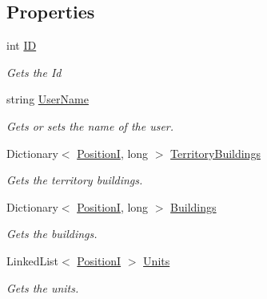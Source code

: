 \subsection*{Properties}
\begin{DoxyCompactItemize}
\item 
int \hyperlink{classCore_1_1Models_1_1Account_a7d03d99ad8aef36cd306111624ee9664}{I\+D}
\begin{DoxyCompactList}\small\item\em Gets the Id \end{DoxyCompactList}\item 
string \hyperlink{classCore_1_1Models_1_1Account_a1ffe9e8e0cfd0a45234e457a39c2de0f}{User\+Name}
\begin{DoxyCompactList}\small\item\em Gets or sets the name of the user. \end{DoxyCompactList}\item 
Dictionary$<$ \hyperlink{classCore_1_1Models_1_1PositionI}{Position\+I}, long $>$ \hyperlink{classCore_1_1Models_1_1Account_a6025997911a09ad2d4917e1bd8e6cf06}{Territory\+Buildings}
\begin{DoxyCompactList}\small\item\em Gets the territory buildings. \end{DoxyCompactList}\item 
Dictionary$<$ \hyperlink{classCore_1_1Models_1_1PositionI}{Position\+I}, long $>$ \hyperlink{classCore_1_1Models_1_1Account_acfadcbec3d6f151ade9cd14fe3c95f9e}{Buildings}
\begin{DoxyCompactList}\small\item\em Gets the buildings. \end{DoxyCompactList}\item 
Linked\+List$<$ \hyperlink{classCore_1_1Models_1_1PositionI}{Position\+I} $>$ \hyperlink{classCore_1_1Models_1_1Account_a474b556453f43f821b4b3c79401288ac}{Units}
\begin{DoxyCompactList}\small\item\em Gets the units. \end{DoxyCompactList}\end{DoxyCompactItemize}


